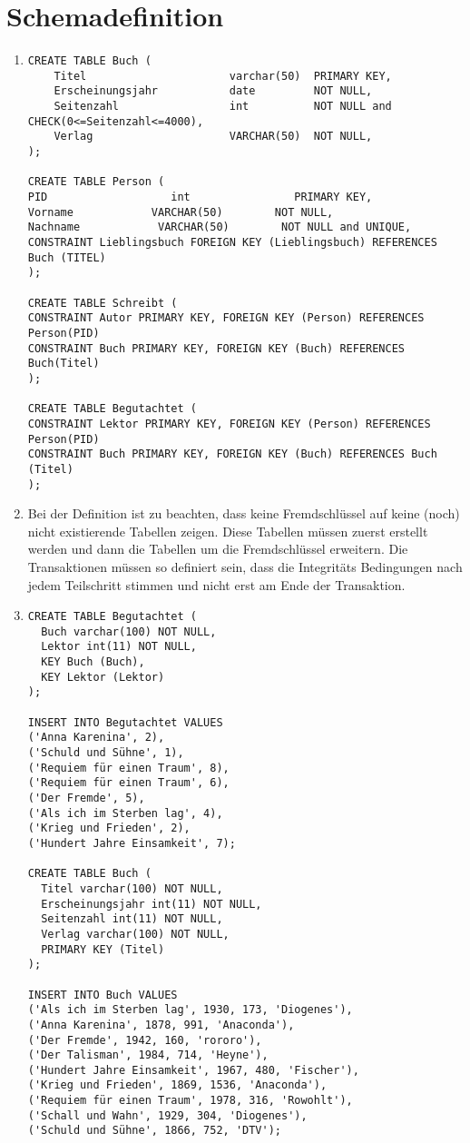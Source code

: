 \documentclass[ngerman]{gdb-aufgabenblatt}
\begin{document}
\section{Schemadefinition}
\begin{enumerate}
\item
\begin{verbatim}
CREATE TABLE Buch (
	Titel                      varchar(50)  PRIMARY KEY,
	Erscheinungsjahr           date         NOT NULL,
	Seitenzahl                 int          NOT NULL and CHECK(0<=Seitenzahl<=4000),
	Verlag                     VARCHAR(50)  NOT NULL,
);

CREATE TABLE Person (
PID          		  int                PRIMARY KEY,
Vorname	     	   VARCHAR(50)        NOT NULL,
Nachname       		VARCHAR(50)        NOT NULL and UNIQUE,
CONSTRAINT Lieblingsbuch FOREIGN KEY (Lieblingsbuch) REFERENCES Buch (TITEL)
);

CREATE TABLE Schreibt (
CONSTRAINT Autor PRIMARY KEY, FOREIGN KEY (Person) REFERENCES Person(PID)
CONSTRAINT Buch PRIMARY KEY, FOREIGN KEY (Buch) REFERENCES Buch(Titel)
);

CREATE TABLE Begutachtet (
CONSTRAINT Lektor PRIMARY KEY, FOREIGN KEY (Person) REFERENCES Person(PID)
CONSTRAINT Buch PRIMARY KEY, FOREIGN KEY (Buch) REFERENCES Buch (Titel)
);
\end{verbatim}
\item
Bei der Definition ist zu beachten, dass keine Fremdschl\"ussel auf keine (noch) nicht existierende Tabellen zeigen. Diese Tabellen m\"ussen zuerst erstellt werden und dann die Tabellen um die Fremdschl\"ussel erweitern. Die Transaktionen m\"ussen so definiert sein, dass die Integrit\"ats Bedingungen nach jedem Teilschritt stimmen und nicht erst am Ende der Transaktion.
\item
\begin{verbatim}
CREATE TABLE Begutachtet (
  Buch varchar(100) NOT NULL,
  Lektor int(11) NOT NULL,
  KEY Buch (Buch),
  KEY Lektor (Lektor)
);

INSERT INTO Begutachtet VALUES
('Anna Karenina', 2),
('Schuld und Sühne', 1),
('Requiem für einen Traum', 8),
('Requiem für einen Traum', 6),
('Der Fremde', 5),
('Als ich im Sterben lag', 4),
('Krieg und Frieden', 2),
('Hundert Jahre Einsamkeit', 7);

CREATE TABLE Buch (
  Titel varchar(100) NOT NULL,
  Erscheinungsjahr int(11) NOT NULL,
  Seitenzahl int(11) NOT NULL,
  Verlag varchar(100) NOT NULL,
  PRIMARY KEY (Titel)
);

INSERT INTO Buch VALUES
('Als ich im Sterben lag', 1930, 173, 'Diogenes'),
('Anna Karenina', 1878, 991, 'Anaconda'),
('Der Fremde', 1942, 160, 'rororo'),
('Der Talisman', 1984, 714, 'Heyne'),
('Hundert Jahre Einsamkeit', 1967, 480, 'Fischer'),
('Krieg und Frieden', 1869, 1536, 'Anaconda'),
('Requiem für einen Traum', 1978, 316, 'Rowohlt'),
('Schall und Wahn', 1929, 304, 'Diogenes'),
('Schuld und Sühne', 1866, 752, 'DTV');


\end{verbatim}
\end{enumerate}
\end{document}
